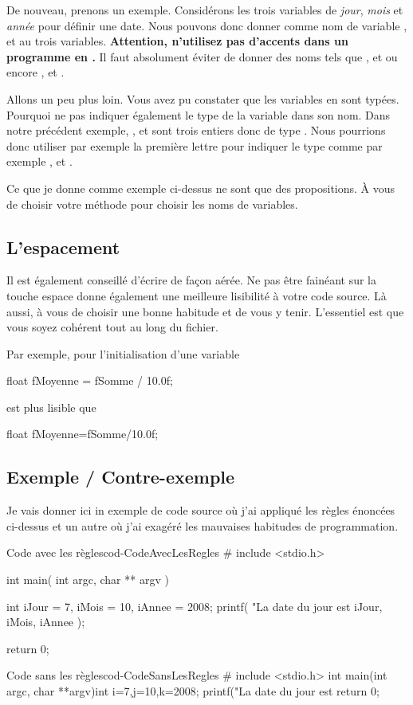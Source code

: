 \documentclass[a4paper]{article}
\begin{document}
			De nouveau, prenons un exemple.
			Considérons les trois variables de \emph{jour}, \emph{mois} et \emph{année} pour définir une date.
			Nous pouvons donc donner comme nom de variable ,  et  au trois variables.
			\textbf{Attention, n'utilisez pas d'accents dans un programme en .}
			Il faut absolument éviter de donner des noms tels que ,  et  ou encore ,  et .

			Allons un peu plus loin.
			Vous avez pu constater que les variables en  sont typées.
			Pourquoi ne pas indiquer également le type de la variable dans son nom.
			Dans notre précédent exemple, ,  et  sont trois entiers donc de type .
			Nous pourrions donc utiliser par exemple la première lettre pour indiquer le type comme par exemple ,  et .

			Ce que je donne comme exemple ci-dessus ne sont que des propositions.
			À vous de choisir votre méthode pour choisir les noms de variables.
		\subsection{L'espacement}
			Il est également conseillé d'écrire de façon aérée.
			Ne pas être fainéant sur la touche espace donne également une meilleure lisibilité à votre code source.
			Là aussi, à vous de choisir une bonne habitude et de vous y tenir.
			L'essentiel est que vous soyez cohérent tout au long du fichier.

			Par exemple, pour l'initialisation d'une variable
			\begin{Code*}
float fMoyenne = fSomme / 10.0f;
			\end{Code*}
			est plus lisible que
			\begin{Code*}
float fMoyenne=fSomme/10.0f;
			\end{Code*}
		\subsection{Exemple / Contre-exemple}
			Je vais donner ici in exemple de code source où j'ai appliqué les règles énoncées ci-dessus et un autre où j'ai exagéré les mauvaises habitudes de programmation.
			\begin{Code}{Code avec les règles}{cod-CodeAvecLesRegles}
# include <stdio.h>

int main( int argc, char ** argv )
{
	int iJour = 7, iMois = 10, iAnnee = 2008;
	printf( "La date du jour est %
		iJour, iMois, iAnnee );

	return 0;
}
			\end{Code}
			\begin{Code}{Code sans les règles}{cod-CodeSansLesRegles}
# include <stdio.h>
int main(int argc, char **argv){int i=7,j=10,k=2008;
printf("La date du jour est %
return 0;}
			\end{Code}
\end{document}
